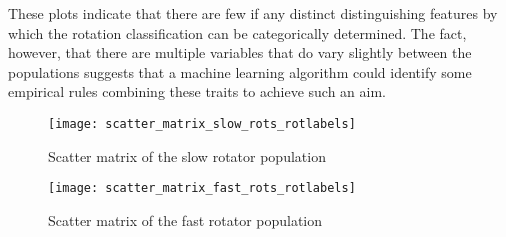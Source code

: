 These plots indicate that there are few if any distinct distinguishing features by which the rotation classification can be categorically determined. The fact, however, that there are multiple variables that do vary slightly between the populations suggests that a machine learning algorithm could identify some empirical rules combining these traits to achieve such an aim.

\begin{sidewaysfigure}[ht]
	\texttt{[image: scatter\_matrix\_slow\_rots\_rotlabels]}
	\caption{Scatter matrix of the slow rotator population}
	\label{fig:MatSlow}
\end{sidewaysfigure}

\begin{sidewaysfigure}[ht]
	\texttt{[image: scatter\_matrix\_fast\_rots\_rotlabels]}
	\caption{Scatter matrix of the fast rotator population}
	\label{fig:MatFast}
\end{sidewaysfigure}
